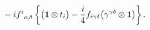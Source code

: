 \begin{equation}
[D_\alpha,D_\beta]=i{f^i}_{\alpha\beta}\left\{\bigl({\bf 1}\otimes t_i\bigr) - 
{i\over 4}f_{i\gamma\delta}\bigl(\gamma^{\gamma\delta}\otimes{\bf 1}\bigr)\right\}.
\end{equation}

